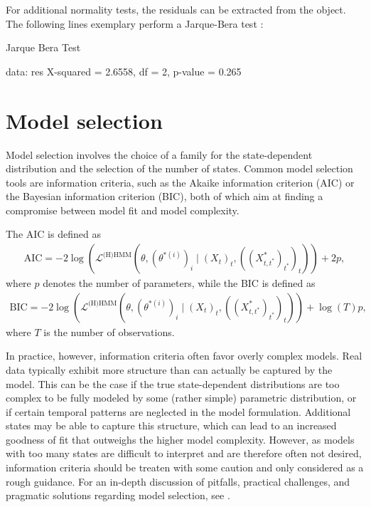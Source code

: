 \documentclass[article]{jss}
\begin{document}
For additional normality tests, the residuals can be extracted from the  object. The following lines exemplary perform a Jarque-Bera test \cite{jar87}:

%
\begin{Schunk}
\begin{Soutput}
	Jarque Bera Test

data:  res
X-squared = 2.6558, df = 2, p-value = 0.265
\end{Soutput}
\end{Schunk}
%


\section{Model selection} \label{sec:model_selection} %

Model selection involves the choice of a family for the state-dependent distribution and the selection of the number of states. Common model selection tools are information criteria, such as the Akaike information criterion (AIC) or the Bayesian information criterion (BIC), both of which aim at finding a compromise between model fit and model complexity.

The AIC is defined as
\begin{align*}
\text{AIC} = - 2 \log (\mathcal{L}^\text{(H)HMM}(\theta,(\theta^{*(i)})_i\mid (X_t)_t,((X^*_{t,t^*})_{t^*})_t)) + 2 p,
\end{align*}
where $p$ denotes the number of parameters, while the BIC is defined as
\begin{align*}
\text{BIC} = - 2 \log (\mathcal{L}^\text{(H)HMM}(\theta,(\theta^{*(i)})_i\mid (X_t)_t,((X^*_{t,t^*})_{t^*})_t)) + \log(T) p,
\end{align*}
where $T$ is the number of observations.

In practice, however, information criteria often favor overly complex models. Real data typically exhibit more structure than can actually be captured by the model. This can be the case if the true state-dependent distributions are too complex to be fully modeled by some (rather simple) parametric distribution, or if certain temporal patterns are neglected in the model formulation. Additional states may be able to capture this structure, which can lead to an increased goodness of fit that outweighs the higher model complexity. However, as models with too many states are difficult to interpret and are therefore often not desired, information criteria should be treaten with some caution and only considered as a rough guidance. For an in-depth discussion of pitfalls, practical challenges, and pragmatic solutions regarding model selection, see \cite{poh17}.
\end{document}
